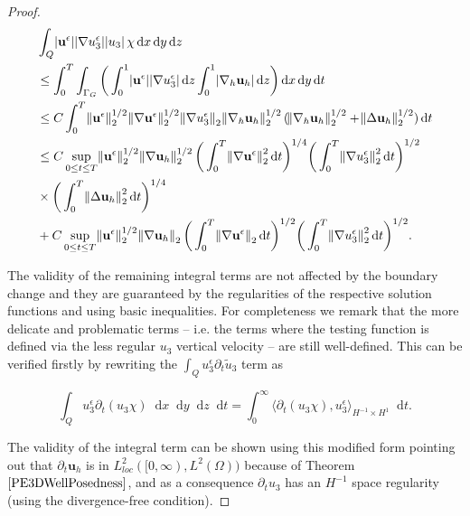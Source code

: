 \documentclass[11pt]{article}
\newcommand*\diff{\mathop{}\!\mathrm{d}}
\begin{document}
\begin{proof}
\begin{equation}
  \begin{split}
    & \int_Q \abs{\mathbf{u}^\epsilon} \abs{\nabla u_3^\epsilon} \abs{u_3} \chi \diff x \diff y \diff z \\
    & \leq  \int_0 ^ T \int_{\Gamma_G} \bigg ( \int_0^1 \abs{\mathbf{u}^\epsilon} \abs{\nabla u_3^\epsilon} \diff z \int_0^1 \abs{\nabla_h \mathbf{u}_h} \diff z \bigg ) \diff x \diff y \diff t \\
    & \leq C \int_0^T \norm{\mathbf{u}^\epsilon}_2^{1/2} \norm{\nabla \mathbf{u}^\epsilon}_2^{1/2} \norm{\nabla u_3^\epsilon}_2 \norm{\nabla_h \mathbf{u}_h}_2^{1/2} (\norm{\nabla_h \mathbf{u}_h}_2^{1/2} + \norm{\Delta \mathbf{u}_h}_2^{1/2}) \diff t \\
    & \leq C \sup_{0 \leq t \leq T} \norm{\mathbf{u}^\epsilon}_2^{1/2} \norm{\nabla \mathbf{u}_h}_2^{1/2} \bigg( \int_0^T \norm{\nabla \mathbf{u}^\epsilon}^2_2 \diff t \bigg)^{1/4} \bigg ( \int_0^T \norm{\nabla u_3^\epsilon}_2^2 \diff t \bigg)^{1/2} \\
    & \times \bigg ( \int_0^T \norm{\Delta \mathbf{u}_h}_2^2 \diff t \bigg )^{1/4} \\
    & + C \sup_{0 \leq t \leq T} \norm{\mathbf{u}^\epsilon}_2^{1/2} \norm{\nabla \mathbf{u}_h}_2 \bigg( \int_0^T \norm{\nabla \mathbf{u}^\epsilon}_2 \diff t \bigg)^{1/2} \bigg ( \int_0^T \norm{\nabla u_3^\epsilon}_2^2 \diff t \bigg)^{1/2}.\raisetag{60pt}
  \end{split}
\end{equation}

The validity of the remaining integral terms are not affected by the boundary change and they are guaranteed by the regularities of the respective solution functions and using basic inequalities. For completeness we remark that the more delicate and problematic terms -- i.e. the terms where the testing function is defined via the less regular $u_3$ vertical velocity -- are still well-defined. This can be verified firstly by rewriting the $\int_Q u^\epsilon_3 \partial_t \tilde{u}_3$ term as

$$ \int_Q u^\epsilon_3 \partial_t (u_3 \chi) \diff x \diff y \diff z \diff t = \int_0^\infty \langle \partial_t (u_3 \chi), u^\epsilon_3 \rangle _ {H^{-1} \times H^1} \diff t.$$

The validity of the integral term can be shown using this modified form pointing out that $\partial_t \mathbf{u}_h$ is in $L^2_{loc} ([0,\infty), L^2(\Omega))$ because of Theorem $\ref{PE3DWellPosedness}$, and as a consequence $\partial_t u_3$ has an $H^{-1}$ space regularity (using the divergence-free condition).


\end{proof}
\end{document}
